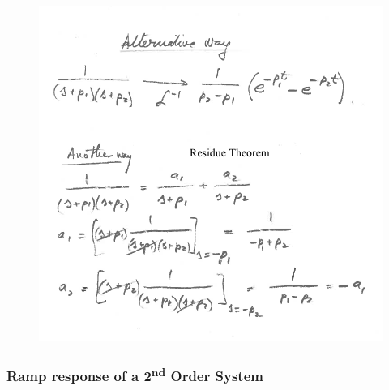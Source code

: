 \documentclass[12pt,letter]{article}
\numberwithin{ex}{section} %
\numberwithin{re}{section} %
\numberwithin{equation}{section}	%
\begin{document}
\begin{mdframed}[middlelinewidth=0.5mm]
\begin{figure}[H]
		\includegraphics[width=5.5in]{../figures/x_t_time_response_2nd_order_impulse_proof_2}
	\end{figure}
\end{mdframed}

\subsubsection{Ramp response of a 2\textsuperscript{nd} Order System}
\end{document}
